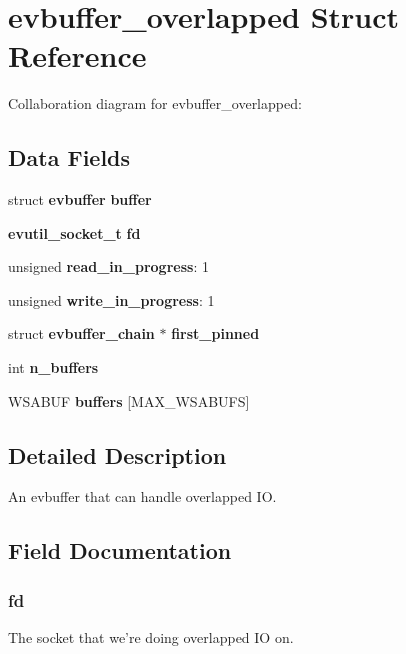 \section{evbuffer\-\_\-overlapped \-Struct \-Reference}
\label{structevbuffer__overlapped}


\-Collaboration diagram for evbuffer\-\_\-overlapped\-:
\subsection*{\-Data \-Fields}
\begin{DoxyCompactItemize}
\item 
struct {\bf evbuffer} {\bfseries buffer}\label{structevbuffer__overlapped_a01e2d74ef433e45641fc19aa615d42b9}

\item 
{\bf evutil\-\_\-socket\-\_\-t} {\bf fd}
\item 
unsigned {\bf read\-\_\-in\-\_\-progress}\-: 1
\item 
unsigned {\bfseries write\-\_\-in\-\_\-progress}\-: 1\label{structevbuffer__overlapped_a90bf3ab335cf50e4cd764b3becbc82f7}

\item 
struct {\bf evbuffer\-\_\-chain} $\ast$ {\bf first\-\_\-pinned}
\item 
int {\bf n\-\_\-buffers}
\item 
\-W\-S\-A\-B\-U\-F {\bfseries buffers} [\-M\-A\-X\-\_\-\-W\-S\-A\-B\-U\-F\-S]\label{structevbuffer__overlapped_aad9a5077a405d7f284b3df11a28e5c62}

\end{DoxyCompactItemize}


\subsection{\-Detailed \-Description}
\-An evbuffer that can handle overlapped \-I\-O. 

\subsection{\-Field \-Documentation}
\subsubsection[{fd}]{ {\bf fd}}\label{structevbuffer__overlapped_adf76ebacdedde5572e9ba938beab2afe}
\-The socket that we're doing overlapped \-I\-O on. 
